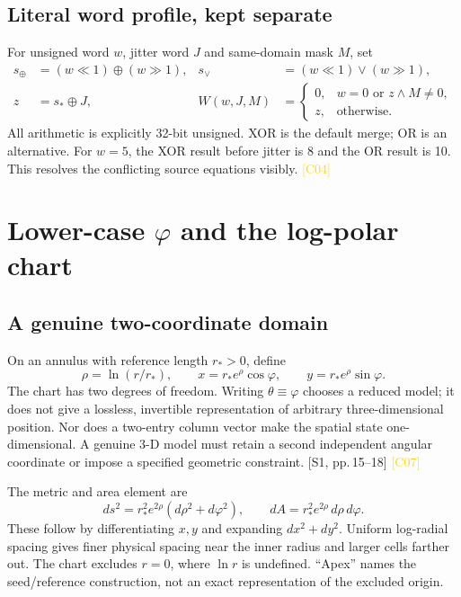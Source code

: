 \documentclass[11pt,a4paper]{article}
\newcommand{\src}[2]{\textcolor{muted}{[#1, #2]}}
\newcommand{\corr}[1]{\textcolor{gold}{\textsf{[#1]}}}
\newcommand{\ph}{\varphi}
\begin{document}
\subsection{Literal word profile, kept separate}
For unsigned word $w$, jitter word $J$ and same-domain mask $M$, set
\begin{align}
 s_\oplus&=(w\ll1)\oplus(w\gg1),&
 s_\lor&=(w\ll1)\lor(w\gg1),\\
 z&=s_*\oplus J,&
 W(w,J,M)&=\begin{cases}0,&w=0\text{ or }z\land M\ne0,\\z,&\text{otherwise.}\end{cases}
\end{align}
All arithmetic is explicitly 32-bit unsigned. XOR is the default merge; OR is an alternative. For $w=5$, the XOR result before jitter is 8 and the OR result is 10. This resolves the conflicting source equations visibly. \corr{C04}
\clearpage

\section{Lower-case \texorpdfstring{$\ph$}{phi} and the log-polar chart}
\subsection{A genuine two-coordinate domain}
On an annulus with reference length $r_*>0$, define
\begin{equation}
 \rho=\ln(r/r_*),\qquad
 x=r_*e^\rho\cos\ph,\qquad y=r_*e^\rho\sin\ph.
\end{equation}
The chart has two degrees of freedom. Writing $\theta\equiv\ph$ chooses a reduced model; it does not give a lossless, invertible representation of arbitrary three-dimensional position. Nor does a two-entry column vector make the spatial state one-dimensional. A genuine 3-D model must retain a second independent angular coordinate or impose a specified geometric constraint. \src{S1}{pp.\,15--18} \corr{C07}

The metric and area element are
\begin{equation}
 ds^2=r_*^2e^{2\rho}(d\rho^2+d\ph^2),\qquad
 dA=r_*^2e^{2\rho}\,d\rho\,d\ph.
\end{equation}
These follow by differentiating $x,y$ and expanding $dx^2+dy^2$. Uniform log-radial spacing gives finer physical spacing near the inner radius and larger cells farther out. The chart excludes $r=0$, where $\ln r$ is undefined. ``Apex'' names the seed/reference construction, not an exact representation of the excluded origin.
\end{document}
